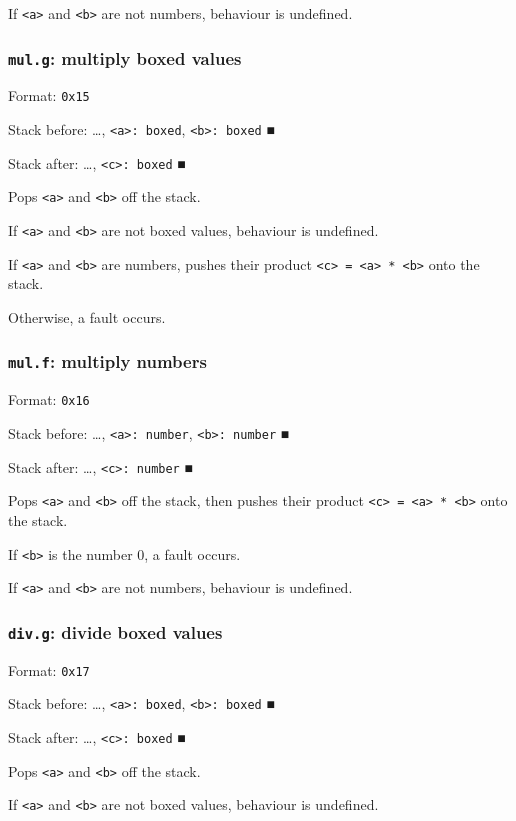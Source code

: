 \documentclass[11pt]{article}
\begin{document}
If \texttt{<a>} and \texttt{<b>} are not numbers, behaviour is undefined.

\subsubsection{\texttt{mul.g}: multiply boxed values}
\label{sec:org742c65a}
Format: \texttt{0x15}

Stack before: \ldots{}​, \texttt{<a>: boxed}, \texttt{<b>: boxed} ■

Stack after: \ldots{}​, \texttt{<c>: boxed} ■

Pops \texttt{<a>} and \texttt{<b>} off the stack.

If \texttt{<a>} and \texttt{<b>} are not boxed values, behaviour is undefined.

If \texttt{<a>} and \texttt{<b>} are numbers, pushes their product \texttt{<c> = <a> * <b>}
onto the stack.

Otherwise, a fault occurs.

\subsubsection{\texttt{mul.f}: multiply numbers}
\label{sec:org29a8cb0}
Format: \texttt{0x16}

Stack before: \ldots{}​, \texttt{<a>: number}, \texttt{<b>: number} ■

Stack after: \ldots{}​, \texttt{<c>: number} ■

Pops \texttt{<a>} and \texttt{<b>} off the stack, then pushes their product
\texttt{<c> = <a> * <b>} onto the stack.

If \texttt{<b>} is the number 0, a fault occurs.

If \texttt{<a>} and \texttt{<b>} are not numbers, behaviour is undefined.

\subsubsection{\texttt{div.g}: divide boxed values}
\label{sec:org97eb268}
Format: \texttt{0x17}

Stack before: \ldots{}​, \texttt{<a>: boxed}, \texttt{<b>: boxed} ■

Stack after: \ldots{}​, \texttt{<c>: boxed} ■

Pops \texttt{<a>} and \texttt{<b>} off the stack.

If \texttt{<a>} and \texttt{<b>} are not boxed values, behaviour is undefined.
\end{document}
